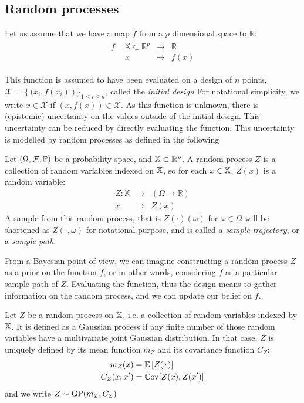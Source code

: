\documentclass[../../Main_ManuscritThese.tex]{subfiles}
\begin{document}
\subsection{Random processes}
Let us assume that we have a map $f$ from a $p$ dimensional space to $\mathbb{R}$:
\begin{align}
  \begin{array}{rrcl}
    f: & \mathbb{X} \subset \mathbb{R}^p& \longrightarrow & \mathbb{R} \\
       & x & \longmapsto & f(x)
  \end{array}
\end{align}

This function is assumed to have been evaluated on a design of $n$ points, $\mathcal{X} = \left\{ (x_i, f(x_i) \right)\}_{1\leq i\leq n}$, called the \emph{initial design} For notational simplicity, we write $x\in \mathcal{X}$ if $(x, f(x)) \in \mathcal{X}$.
As this function is unknown, there is (epistemic) uncertainty on the values outside of the initial design. This uncertainty can be reduced by directly evaluating the function.
This uncertainty is modelled by random processes as defined in the following

\begin{definition}
  Let $(\Omega, \mathcal{F}, \mathbb{P})$ be a probability space, and $\mathbb{X}\subset \mathbb{R}^p$.
  A random process $Z$ is a collection of random variables indexed on $\mathbb{X}$, so for each $x \in \mathbb{X}$, $Z(x)$ is a random variable:
 \begin{equation}
  \begin{array}{rcl}
    Z: \mathbb{X} & \longrightarrow & \left(\Omega \rightarrow \mathbb{R} \right)\\
    x& \longmapsto & Z(x)
  \end{array}
\end{equation}
A sample from this random process, that is $Z(\cdot)(\omega)$ for $\omega \in \Omega$ will be shortened as $Z(\cdot, \omega)$ for notational purpose, and is called a \emph{sample trajectory}, or a \emph{sample path}.
\end{definition}
From a Bayesian point of view, we can imagine constructing a random process $Z$ as a prior on the function $f$, or in other words, considering $f$ as a particular sample path of $Z$. Evaluating the function, thus  the design means to gather information on the random process, and we can update our belief on $f$.


\begin{definition}
  Let $Z$ be a random process on $\mathbb{X}$, i.e. a collection of random variables indexed by $\mathbb{X}$. It is defined as a Gaussian process if any finite number of those random variables have a multivariate joint Gaussian distribution.
  In that case, $Z$ is uniquely defined by its mean function $m_Z$ and its covariance function $C_Z$:
  \begin{align}
    m_Z(x) &= \mathbb{E}\left[Z(x)\right] \\
    C_Z(x, x^{\prime}) &= \mathbb{C}\mathrm{ov}[Z(x), Z(x^{\prime})]
  \end{align}
  and we write $Z \sim \operatorname{\mathrm{GP}}(m_Z, C_Z)$
\end{definition}
\end{document}
